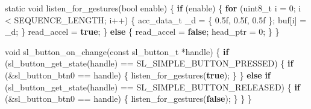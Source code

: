 \documentclass[
  9pt,
  letterpaper,
  abstract,
  titlepage]{scrbook}
\newenvironment{Shaded}{\begin{snugshade}}{\end{snugshade}}
\newcommand{\BuiltInTok}[1]{\textcolor[rgb]{0.00,0.23,0.31}{#1}}
\newcommand{\ControlFlowTok}[1]{\textcolor[rgb]{0.00,0.23,0.31}{\textbf{#1}}}
\newcommand{\DataTypeTok}[1]{\textcolor[rgb]{0.68,0.00,0.00}{#1}}
\newcommand{\DecValTok}[1]{\textcolor[rgb]{0.68,0.00,0.00}{#1}}
\newcommand{\FloatTok}[1]{\textcolor[rgb]{0.68,0.00,0.00}{#1}}
\newcommand{\KeywordTok}[1]{\textcolor[rgb]{0.00,0.23,0.31}{\textbf{#1}}}
\newcommand{\NormalTok}[1]{\textcolor[rgb]{0.00,0.23,0.31}{#1}}
\newcommand{\OperatorTok}[1]{\textcolor[rgb]{0.37,0.37,0.37}{#1}}
\begin{document}
\begin{Shaded}
\begin{Highlighting}[]
\DataTypeTok{static} \DataTypeTok{void}\NormalTok{ listen\_for\_gestures}\OperatorTok{(}\DataTypeTok{bool}\NormalTok{ enable}\OperatorTok{)}
\OperatorTok{\{}
  \ControlFlowTok{if} \OperatorTok{(}\NormalTok{enable}\OperatorTok{)} \OperatorTok{\{}
    \ControlFlowTok{for} \OperatorTok{(}\DataTypeTok{uint8\_t}\NormalTok{ i }\OperatorTok{=} \DecValTok{0}\OperatorTok{;}\NormalTok{ i }\OperatorTok{\textless{}}\NormalTok{ SEQUENCE\_LENGTH}\OperatorTok{;}\NormalTok{ i}\OperatorTok{++)} \OperatorTok{\{}
\NormalTok{      acc\_data\_t \_d }\OperatorTok{=} \OperatorTok{\{} \FloatTok{0.5}\BuiltInTok{f}\OperatorTok{,} \FloatTok{0.5}\BuiltInTok{f}\OperatorTok{,} \FloatTok{0.5}\BuiltInTok{f} \OperatorTok{\};}
\NormalTok{      buf}\OperatorTok{[}\NormalTok{i}\OperatorTok{]} \OperatorTok{=}\NormalTok{ \_d}\OperatorTok{;}
    \OperatorTok{\}}
\NormalTok{    read\_accel }\OperatorTok{=} \KeywordTok{true}\OperatorTok{;}
  \OperatorTok{\}} \ControlFlowTok{else} \OperatorTok{\{}
\NormalTok{    read\_accel }\OperatorTok{=} \KeywordTok{false}\OperatorTok{;}
\NormalTok{    head\_ptr }\OperatorTok{=} \DecValTok{0}\OperatorTok{;}
  \OperatorTok{\}}
\OperatorTok{\}}

\DataTypeTok{void}\NormalTok{ sl\_button\_on\_change}\OperatorTok{(}\DataTypeTok{const}\NormalTok{ sl\_button\_t }\OperatorTok{*}\NormalTok{handle}\OperatorTok{)}
\OperatorTok{\{}
  \ControlFlowTok{if} \OperatorTok{(}\NormalTok{sl\_button\_get\_state}\OperatorTok{(}\NormalTok{handle}\OperatorTok{)} \OperatorTok{==}\NormalTok{ SL\_SIMPLE\_BUTTON\_PRESSED}\OperatorTok{)} \OperatorTok{\{}
    \ControlFlowTok{if} \OperatorTok{(\&}\NormalTok{sl\_button\_btn0 }\OperatorTok{==}\NormalTok{ handle}\OperatorTok{)} \OperatorTok{\{}
\NormalTok{      listen\_for\_gestures}\OperatorTok{(}\KeywordTok{true}\OperatorTok{);}
    \OperatorTok{\}}
  \OperatorTok{\}} \ControlFlowTok{else} \ControlFlowTok{if} \OperatorTok{(}\NormalTok{sl\_button\_get\_state}\OperatorTok{(}\NormalTok{handle}\OperatorTok{)} \OperatorTok{==}\NormalTok{ SL\_SIMPLE\_BUTTON\_RELEASED}\OperatorTok{)} \OperatorTok{\{}
    \ControlFlowTok{if} \OperatorTok{(\&}\NormalTok{sl\_button\_btn0 }\OperatorTok{==}\NormalTok{ handle}\OperatorTok{)} \OperatorTok{\{}
\NormalTok{      listen\_for\_gestures}\OperatorTok{(}\KeywordTok{false}\OperatorTok{);}
    \OperatorTok{\}}
  \OperatorTok{\}}
\OperatorTok{\}}


\end{Highlighting}
\end{Shaded}
\end{document}

